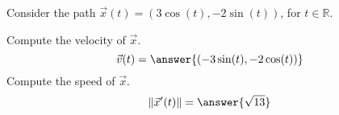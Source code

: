 \begin{problem}
Consider the path $\vec{x}(t) = (3\cos(t), -2\sin(t))$, for $t\in\mathbb{R}$.

Compute the velocity of $\vec{x}$.
\[
\vec{v}(t) = \answer{(-3\sin(t), -2\cos(t))}
\]
Compute the speed of $\vec{x}$.
\[
\|\vec{x}'(t)\| = \answer{\sqrt{13}}
\]

\end{problem}